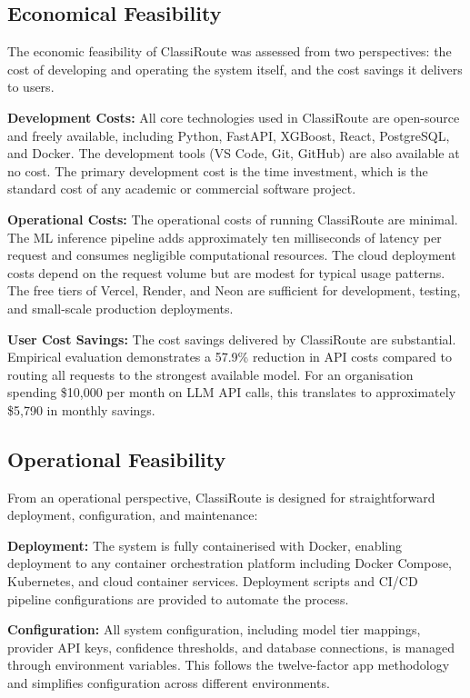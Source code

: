 \documentclass[oneside,12pt,a4paper]{report}
\begin{document}
\subsection{Economical Feasibility}

The economic feasibility of ClassiRoute was assessed from two perspectives: the cost of developing and operating the system itself, and the cost savings it delivers to users.

\textbf{Development Costs:} All core technologies used in ClassiRoute are open-source and freely available, including Python, FastAPI, XGBoost, React, PostgreSQL, and Docker. The development tools (VS Code, Git, GitHub) are also available at no cost. The primary development cost is the time investment, which is the standard cost of any academic or commercial software project.

\textbf{Operational Costs:} The operational costs of running ClassiRoute are minimal. The ML inference pipeline adds approximately ten milliseconds of latency per request and consumes negligible computational resources. The cloud deployment costs depend on the request volume but are modest for typical usage patterns. The free tiers of Vercel, Render, and Neon are sufficient for development, testing, and small-scale production deployments.

\textbf{User Cost Savings:} The cost savings delivered by ClassiRoute are substantial. Empirical evaluation demonstrates a 57.9\% reduction in API costs compared to routing all requests to the strongest available model. For an organisation spending \$10,000 per month on LLM API calls, this translates to approximately \$5,790 in monthly savings.

\subsection{Operational Feasibility}

From an operational perspective, ClassiRoute is designed for straightforward deployment, configuration, and maintenance:

\textbf{Deployment:} The system is fully containerised with Docker, enabling deployment to any container orchestration platform including Docker Compose, Kubernetes, and cloud container services. Deployment scripts and CI/CD pipeline configurations are provided to automate the process.

\textbf{Configuration:} All system configuration, including model tier mappings, provider API keys, confidence thresholds, and database connections, is managed through environment variables. This follows the twelve-factor app methodology and simplifies configuration across different environments.
\end{document}
